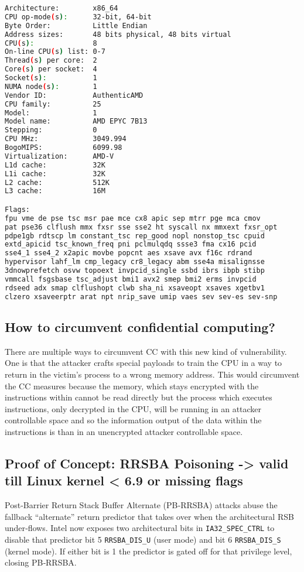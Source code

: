 \documentclass[11pt,a4paper]{article}
\begin{document}
\begin{lstlisting}[language=bash]
Architecture:        x86_64
CPU op-mode(s):      32-bit, 64-bit
Byte Order:          Little Endian
Address sizes:       48 bits physical, 48 bits virtual
CPU(s):              8
On-line CPU(s) list: 0-7
Thread(s) per core:  2
Core(s) per socket:  4
Socket(s):           1
NUMA node(s):        1
Vendor ID:           AuthenticAMD
CPU family:          25
Model:               1
Model name:          AMD EPYC 7B13
Stepping:            0
CPU MHz:             3049.994
BogoMIPS:            6099.98
Virtualization:      AMD-V
L1d cache:           32K
L1i cache:           32K
L2 cache:            512K
L3 cache:            16M

Flags:
fpu vme de pse tsc msr pae mce cx8 apic sep mtrr pge mca cmov 
pat pse36 clflush mmx fxsr sse sse2 ht syscall nx mmxext fxsr_opt 
pdpe1gb rdtscp lm constant_tsc rep_good nopl nonstop_tsc cpuid 
extd_apicid tsc_known_freq pni pclmulqdq ssse3 fma cx16 pcid 
sse4_1 sse4_2 x2apic movbe popcnt aes xsave avx f16c rdrand 
hypervisor lahf_lm cmp_legacy cr8_legacy abm sse4a misalignsse 
3dnowprefetch osvw topoext invpcid_single ssbd ibrs ibpb stibp 
vmmcall fsgsbase tsc_adjust bmi1 avx2 smep bmi2 erms invpcid 
rdseed adx smap clflushopt clwb sha_ni xsaveopt xsaves xgetbv1 
clzero xsaveerptr arat npt nrip_save umip vaes sev sev-es sev-snp
\end{lstlisting}

\subsection{How to circumvent confidential computing?}
There are multiple ways to circumvent CC with this new kind of vulnerability. One is that the attacker crafts special payloads to train the CPU in a way to return in the victim's process to a wrong memory address. This would circumvent the CC measures because the memory, which stays encrypted with the instructions within cannot be read directly but the process which executes instructions, only decrypted in the CPU, will be running in an attacker controllable space and so the information output of the data within the instructions is than in an unencrypted attacker controllable space.

\subsection{Proof of Concept: RRSBA Poisoning -> valid till Linux kernel < 6.9 or missing flags}
Post‑Barrier Return Stack Buffer Alternate (PB‑RRSBA) attacks abuse the fallback “alternate” return predictor that takes over when the architectural RSB under‑flows. Intel now exposes two architectural bits in \texttt{IA32\_SPEC\_CTRL} to disable that predictor bit 5 \texttt{RRSBA\_DIS\_U} (user mode) and bit 6 \texttt{RRSBA\_DIS\_S} (kernel mode). If either bit is 1 the predictor is gated off for that privilege level, closing PB‑RRSBA.
\end{document}
